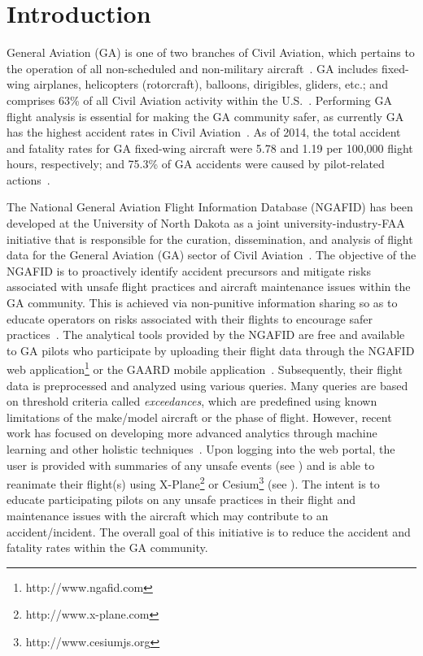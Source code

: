 
\chapter{Introduction} \label{ch:introduction}

	General Aviation (GA) is one of two branches of Civil Aviation, which pertains to the operation of all non-scheduled and non-military aircraft~\cite{aopa2009what,allen2006general,federal-aviation-administration2016the-economic,kenny201726th}.  GA includes fixed-wing airplanes, helicopters (rotorcraft), balloons, dirigibles, gliders, etc.; and comprises 63\% of all Civil Aviation activity within the U.S.~\cite{aopa2009what,federal-aviation-administration2016the-economic,shetty2012current}.  Performing GA flight analysis is essential for making the GA community safer, as currently GA has the highest accident rates in Civil Aviation~\cite{kenny201726th,aopa-air-safety-institute20172015-2016}.  As of 2014, the total accident and fatality rates for GA fixed-wing aircraft were 5.78 and 1.19 per 100,000 flight hours, respectively; and 75.3\% of GA accidents were caused by pilot-related actions~\cite{kenny201726th}.

	The National General Aviation Flight Information Database (NGAFID) has been developed at the University of North Dakota as a joint university-industry-FAA initiative that is responsible for the curation, dissemination, and analysis of flight data for the General Aviation (GA) sector of Civil Aviation~\cite{clacharlarge-scale,url_ngafid}.  The objective of the NGAFID is to proactively identify accident precursors and mitigate risks associated with unsafe flight practices and aircraft maintenance issues within the GA community.  This is achieved via non-punitive information sharing so as to educate operators on risks associated with their flights to encourage safer practices~\cite{clacharlarge-scale}.  The analytical tools provided by the NGAFID are free and available to GA pilots who participate by uploading their flight data through the NGAFID web application\footnote{http://www.ngafid.com} or the GAARD mobile application~\cite{url_gaard}.  Subsequently, their flight data is preprocessed and analyzed using various queries.  Many queries are based on threshold criteria called \textit{exceedances}, which are predefined using known limitations of the make/model aircraft or the phase of flight. However, recent work has focused on developing more advanced analytics through machine learning and other holistic techniques~\cite{sophine2014identifying,sophine2016phd,desell2015evolving,elsaid2016vibration,elsaid2016thesis,desell2014evolving}.  Upon logging into the web portal, the user is provided with summaries of any unsafe events (see ) and is able to reanimate their flight(s) using X-Plane\footnote{http://www.x-plane.com} or Cesium\footnote{http://www.cesiumjs.org} (see ).  The intent is to educate participating pilots on any unsafe practices in their flight and maintenance issues with the aircraft which may contribute to an accident/incident. The overall goal of this initiative is to reduce the accident and fatality rates within the GA community.

